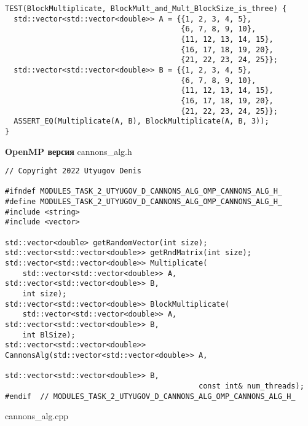 \documentclass{report}
\begin{document}
\begin{lstlisting}
TEST(BlockMultiplicate, BlockMult_and_Mult_BlockSize_is_three) {
  std::vector<std::vector<double>> A = {{1, 2, 3, 4, 5},
                                        {6, 7, 8, 9, 10},
                                        {11, 12, 13, 14, 15},
                                        {16, 17, 18, 19, 20},
                                        {21, 22, 23, 24, 25}};
  std::vector<std::vector<double>> B = {{1, 2, 3, 4, 5},
                                        {6, 7, 8, 9, 10},
                                        {11, 12, 13, 14, 15},
                                        {16, 17, 18, 19, 20},
                                        {21, 22, 23, 24, 25}};
  ASSERT_EQ(Multiplicate(A, B), BlockMultiplicate(A, B, 3));
}
\end{lstlisting}

\textbf{OpenMP версия}
\newline
\newline cannons\_alg.h
\begin{lstlisting}
// Copyright 2022 Utyugov Denis

#ifndef MODULES_TASK_2_UTYUGOV_D_CANNONS_ALG_OMP_CANNONS_ALG_H_
#define MODULES_TASK_2_UTYUGOV_D_CANNONS_ALG_OMP_CANNONS_ALG_H_
#include <string>
#include <vector>

std::vector<double> getRandomVector(int size);
std::vector<std::vector<double>> getRndMatrix(int size);
std::vector<std::vector<double>> Multiplicate(
    std::vector<std::vector<double>> A, std::vector<std::vector<double>> B,
    int size);
std::vector<std::vector<double>> BlockMultiplicate(
    std::vector<std::vector<double>> A, std::vector<std::vector<double>> B,
    int BlSize);
std::vector<std::vector<double>> CannonsAlg(std::vector<std::vector<double>> A,
                                            std::vector<std::vector<double>> B,
                                            const int& num_threads);
#endif  // MODULES_TASK_2_UTYUGOV_D_CANNONS_ALG_OMP_CANNONS_ALG_H_

\end{lstlisting}
cannons\_alg.cpp
\end{document}

